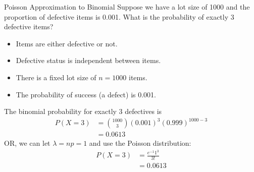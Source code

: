 \begin{frame}{Poisson Approximation to Binomial}
    Suppose we have a lot size of 1000 and the proportion of defective items is 0.001. What is the probability of exactly 3 defective items?
    \begin{itemize}
        \item Items are either defective or not.
        \item Defective status is independent between items.
        \item There is a fixed lot size of $n=1000$ items.
        \item The probability of success (a defect) is 0.001.
    \end{itemize}
\end{frame}

\begin{frame}{}
    The binomial probability for exactly 3 defectives is
    \begin{align*}
        P(X=3) &= {1000 \choose 3}(0.001)^3(0.999)^{1000-3} \\
        &= 0.0613
    \end{align*}
    OR, we can let $\lambda=np=1$ and use the Poisson distribution:
    \begin{align*}
        P(X=3) &= \frac{e^{-1}1^3}{3!} \\
        &= 0.0613
    \end{align*}
\end{frame}